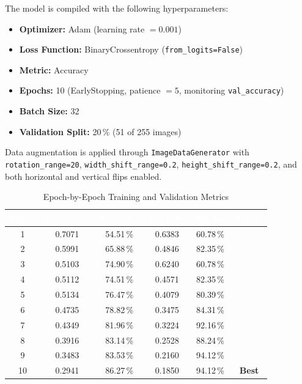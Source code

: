 \documentclass[12pt,a4paper]{article}
\begin{document}
The model is compiled with the following hyperparameters:

\begin{itemize}
    \item \textbf{Optimizer:}       Adam (learning rate $= 0.001$)
    \item \textbf{Loss Function:}   BinaryCrossentropy (\texttt{from\_logits=False})
    \item \textbf{Metric:}          Accuracy
    \item \textbf{Epochs:}          10 (EarlyStopping, patience $= 5$, monitoring \texttt{val\_accuracy})
    \item \textbf{Batch Size:}      32
    \item \textbf{Validation Split:} 20\,\% (51 of 255 images)
\end{itemize}

Data augmentation is applied through \texttt{ImageDataGenerator} with
\texttt{rotation\_range=20}, \texttt{width\_shift\_range=0.2},
\texttt{height\_shift\_range=0.2}, and both horizontal and vertical
flips enabled.

\begin{table}[H]
\centering
\renewcommand{\arraystretch}{1.4}
\begin{tabular}{|c|c|c|c|c|c|}
\hline
\rowcolor{black}
\textcolor{white}{\textbf{Epoch}} &
\textcolor{white}{\textbf{Train Loss}} &
\textcolor{white}{\textbf{Train Acc}} &
\textcolor{white}{\textbf{Val Loss}} &
\textcolor{white}{\textbf{Val Acc}} &
\textcolor{white}{\textbf{Status}} \\
\hline
1  & 0.7071 & 54.51\,\% & 0.6383 & 60.78\,\% & \\
\hline
2  & 0.5991 & 65.88\,\% & 0.4846 & 82.35\,\% & \\
\hline
3  & 0.5103 & 74.90\,\% & 0.6240 & 60.78\,\% & \\
\hline
4  & 0.5112 & 74.51\,\% & 0.4571 & 82.35\,\% & \\
\hline
5  & 0.5134 & 76.47\,\% & 0.4079 & 80.39\,\% & \\
\hline
6  & 0.4735 & 78.82\,\% & 0.3475 & 84.31\,\% & \\
\hline
7  & 0.4349 & 81.96\,\% & 0.3224 & 92.16\,\% & \\
\hline
8  & 0.3916 & 83.14\,\% & 0.2528 & 88.24\,\% & \\
\hline
9  & 0.3483 & 83.53\,\% & 0.2160 & 94.12\,\% & \\
\hline
10 & 0.2941 & 86.27\,\% & 0.1850 & 94.12\,\% & \textbf{Best} \\
\hline
\end{tabular}
\caption{Epoch-by-Epoch Training and Validation Metrics}
\end{table}
\end{document}
